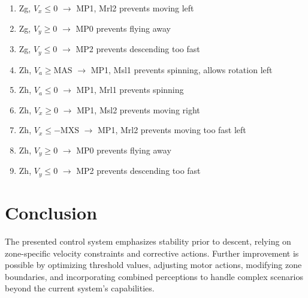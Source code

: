 \documentclass{article}
\begin{document}
\begin{enumerate}
    \item Zg, $V_x \leq 0$ $\rightarrow$ MP1, Mrl2 \hfill prevents moving left
    \item Zg, $V_y \geq 0$ $\rightarrow$ MP0 \hfill prevents flying away
    \item Zg, $V_y \leq 0$ $\rightarrow$ MP2 \hfill prevents descending too fast
    \item Zh, $V_a \geq \text{MAS}$ $\rightarrow$ MP1, Msl1 \hfill prevents spinning, allows rotation left
    \item Zh, $V_a \leq 0$ $\rightarrow$ MP1, Mrl1 \hfill prevents spinning
    \item Zh, $V_x \geq 0$ $\rightarrow$ MP1, Msl2 \hfill prevents moving right
    \item Zh, $V_x \leq -\text{MXS}$ $\rightarrow$ MP1, Mrl2 \hfill prevents moving too fast left
    \item Zh, $V_y \geq 0$ $\rightarrow$ MP0 \hfill prevents flying away
    \item Zh, $V_y \leq 0$ $\rightarrow$ MP2 \hfill prevents descending too fast
\end{enumerate}

\section{Conclusion}
The presented control system emphasizes stability prior to descent, relying on zone-specific velocity constraints and corrective actions. Further improvement is possible by optimizing threshold values, adjusting motor actions, modifying zone boundaries, and incorporating combined perceptions to handle complex scenarios beyond the current system's capabilities.
\end{document}
